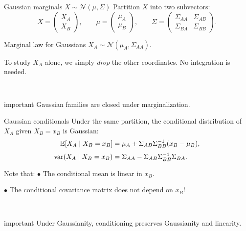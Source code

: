 \documentclass[dvipsnames,aspectratio=169,handout]{beamer}
\begin{document}
\begin{frame}{Gaussian marginals $X\sim \mathcal N(\mu,\Sigma)$}
Partition $X$ into two subvectors:
\[
X=
\begin{pmatrix}
X_A\\ X_B
\end{pmatrix},
\qquad
\mu=
\begin{pmatrix}
\mu_A\\ \mu_B
\end{pmatrix},
\qquad
\Sigma=
\begin{pmatrix}
\Sigma_{AA} & \Sigma_{AB}\\
\Sigma_{BA} & \Sigma_{BB}
\end{pmatrix}.
\]

\begin{block}{Marginal law for Gaussians}
\qquad\qquad\qquad\qquad\qquad\qquad\qquad$X_A\sim \mathcal N(\mu_A,\Sigma_{AA})$.
\end{block}
\vspace{-5mm}
\begin{alertblock}{}
To study $X_A$ alone, we simply \emph{drop} the other coordinates.
No integration is needed.
\end{alertblock}
\ \\
\begin{beamercolorbox}[wd=\textwidth,sep=7pt,center,rounded=true,shadow=true]{important}
Gaussian families are closed under marginalization.
\end{beamercolorbox}
\end{frame}

\begin{frame}{Gaussian conditionals}
Under the same partition,
the conditional distribution of $X_A$ given $X_B=x_B$ is Gaussian:
\begin{align*}
\mathbb{E}[X_A\mid X_B=x_B]
&=
\mu_A+\Sigma_{AB}\Sigma_{BB}^{-1}(x_B-\mu_B),\\[1mm]
\operatorname{var}(X_A\mid X_B=x_B)
&=
\Sigma_{AA}-\Sigma_{AB}\Sigma_{BB}^{-1}\Sigma_{BA}.
\end{align*}

\begin{block}{Note that:}
\qquad$\bullet$ The conditional mean is linear in $x_B$.

\qquad$\bullet$ The conditional covariance matrix does not depend on $x_B$!
\end{block}

\ 
\begin{beamercolorbox}[wd=\textwidth,sep=7pt,center,rounded=true,shadow=true]{important}
Under Gaussianity, conditioning preserves Gaussianity and linearity.
\end{beamercolorbox}
\end{frame}
\end{document}
